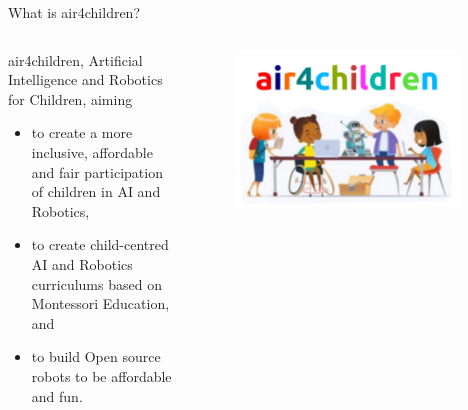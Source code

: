 {
\begin{frame}{What is air4children?}

  \begin{columns}
  \begin{column}{.7\linewidth}

  air4children, Artificial Intelligence and Robotics for Children, aiming  
  \begin{itemize}
    \item to create a more inclusive, affordable and fair participation of children in AI and Robotics,
    \item to create child-centred AI and Robotics curriculums based on Montessori Education, and
    \item to build Open source robots to be affordable and fun. 
  \end{itemize}

    \end{column}


  \begin{column}{.4\linewidth}

      \begin{figure}
        \centering
        \includegraphics[width=0.95\textwidth]{./figures/logo/outputs/drawing-v00.png}
      \end{figure}

    \end{column}
  \end{columns}

\end{frame}
}




